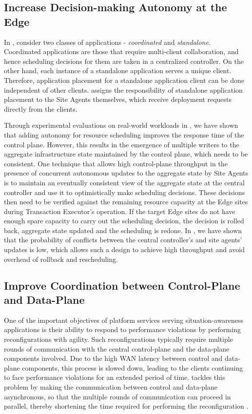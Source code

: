 \subsection{Increase Decision-making Autonomy at the Edge}
In \oneedge{}, consider two classes of applications - \textit{coordinated} and \textit{standalone}. Coordinated applications are those that require multi-client collaboration, and hence scheduling decisions for them are taken in a centralized controller. On the other hand, each instance of a standalone application serves a unique client. Therefore, application placement for a standalone application client can be done independent of other clients. \oneedge{} assigns the responsibility of standalone application placement to the Site Agents themselves, which receive deployment requests directly from the clients. 
\par Through experimental evaluations on real-world workloads in \cite{oneedge}, we have shown that adding autonomy for resource scheduling improves the response time of the control plane. However, this results in the emergence of multiple writers to the aggregate infrastructure state maintained by the control plane, which needs to be consistent. One technique that allows high control-plane throughput in the presence of concurrent autonomous updates to the aggregate state by Site Agents is to maintain an eventually consistent view of the aggregate state at the central controller and use it to optimistically make scheduling decisions. These decisions then need to be verified against the remaining resource capacity at the Edge sites during Transaction Executor's operation. If the target Edge sites do not have enough spare capacity to carry out the scheduling decision, the decision is rolled back, aggregate state updated and the scheduling is redone. In \cite{oneedge}, we have shown that the probability of conflicts between the central controller's and site agents' updates is low, which allows such a design to achieve high throughput and avoid overhead of rollback and rescheduling.

\subsection{Improve Coordination between Control-Plane and Data-Plane}
One of the important objectives of platform services serving situation-awareness applications is their ability to respond to performance violations by performing reconfigurations with agility. Such reconfigurations typically require multiple rounds of communication with the central control-plane and the data-plane components involved. Due to the high WAN latency between control and data-plane components, this process is slowed down, leading to the clients continuing to face performance violations for an extended period of time. \epulsar{} tackles this problem by making the communication between control and data-plane asynchronous, so that the multiple rounds of communication can proceed in parallel, thereby shortening the time required for performing the reconfiguration \cite{epulsar}.


